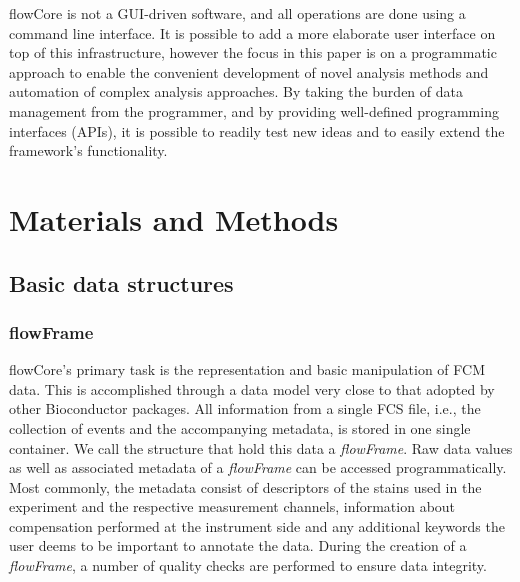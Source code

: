 \documentclass[12pt]{article}
\newcommand{\Rpackage}[1]{{\textsf{#1}}}
\newcommand{\Rclass}[1]{{\textit{#1}}}
\begin{document}
\Rpackage{flowCore} is not a GUI-driven software, and all operations
are done using a command line interface.  It is possible to add a more
elaborate user interface on top of this infrastructure, however the
focus in this paper is on a programmatic approach to enable the
convenient development of novel analysis methods and automation of
complex analysis approaches.  By taking the burden of data management
from the programmer, and by providing well-defined programming
interfaces (APIs), it is possible to readily test new ideas and to
easily extend the framework's functionality.



\section*{Materials and Methods}
\subsection*{Basic data structures}
\subsubsection*{flowFrame}

\Rpackage{flowCore}'s primary task is the representation and basic
manipulation of FCM data. This is accomplished through a data model
very close to that adopted by other Bioconductor packages. All
information from a single FCS file, i.e., the collection of events and
the accompanying metadata, is stored in one single container. We call
the structure that hold this data a \Rclass{flowFrame}. Raw data
values as well as associated metadata of a \Rclass{flowFrame} can be
accessed programmatically. Most commonly, the metadata consist of
descriptors of the stains used in the experiment and the respective
measurement channels, information about compensation performed at the
instrument side and any additional keywords the user deems to be
important to annotate the data. During the creation of a
\Rclass{flowFrame}, a number of quality checks are performed to ensure
data integrity.
\end{document}
